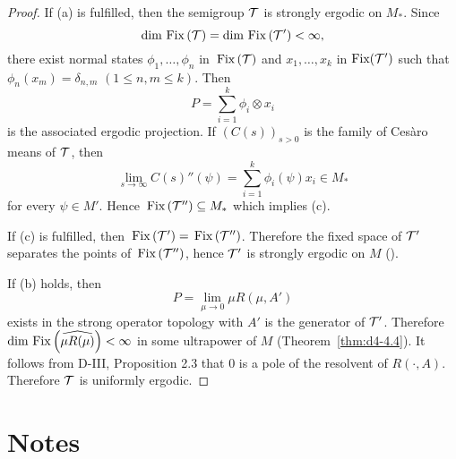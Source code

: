 \begin{proof}
If (a) is fulfilled, then the semigroup $ \mathcal{T} $  is strongly ergodic on $ M_{*} $.
Since
\[
\dim \mathop{}\mathrm{Fix}\left(\mathcal{T}\right) = \dim \mathop{}\mathrm{Fix}\left(\mathcal{T}'\right) < \infty,
\]
there exist normal states $ \phi_{1},\ldots,\phi_{n} $  in $ \mathop{}\mathrm{Fix}\left(\mathcal{T}\right) $  and $ x_{1},\ldots,x_{k} $  in $ \text{Fix}(\mathcal{T}') $  such that $ \phi_{n}(x_{m}) = \delta_{n,m} $  $ (1 \leq n, m \leq k) $.
Then 
\[
P = \sum_{i=1}^{k} \phi_{i} \otimes x_{i} 
\]
is the associated ergodic projection.
If $ (C(s))_{s>0} $  is the family of Cesàro means of $ \mathcal{T} $, then
\[
\lim_{s \to \infty} C(s)''(\psi) = \sum_{i=1}^{k} \phi_{i}(\psi)x_{i} \in M_{*}
\]
for every $ \psi \in M' $.
Hence $ \mathop{}\mathrm{Fix}\left(\mathcal{T}''\right) \subseteq M_{*} $  which implies (c).

If (c) is fulfilled, then $ \mathop{}\mathrm{Fix}\left(\mathcal{T}'\right) = \mathop{}\mathrm{Fix}\left(\mathcal{T}''\right) $.
Therefore the fixed space of $ \mathcal{T}' $  separates the points of $ \mathop{}\mathrm{Fix}\left(\mathcal{T}''\right) $, hence $ \mathcal{T}' $  is strongly ergodic on $ M $  (\citet[Chap.2, Thm.1.4]{krengel:1985}).

If (b) holds, then
\[
P = \lim_{\mu \to 0} \mu R(\mu,A')
\]
exists in the strong operator topology with $ A' $  is the generator of $ \mathcal{T}' $.
Therefore $ \dim \mathop{}\mathrm{Fix}\left(\widehat{\mu R(\mu)}\right) < \infty $  in some ultrapower of $ M $  (Theorem~\ref{thm:d4-4.4}).
It follows from D-III, Proposition 2.3 that 0 is a pole of the resolvent of $ R(\cdot,A) $.
Therefore $ \mathcal{T} $  is uniformly ergodic.
\end{proof}
\section*{Notes}\label{notes:d4-notes}

